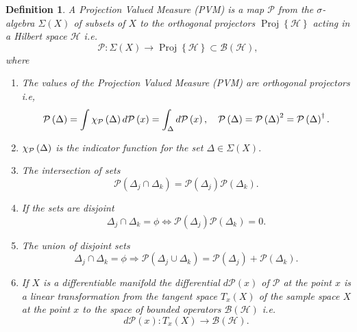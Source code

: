 \documentclass[aps,preprint]{revtex4}%
\newtheorem{definition}[theorem]{Definition}
\begin{document}
\begin{definition}
A Projection Valued Measure (PVM) is a map $\mathcal{P}$ from the $\sigma
$-algebra $\Sigma\left(  X\right)  $ of subsets of $X$ to the orthogonal
projectors $\operatorname*{Proj}\left\{  \mathcal{H}\right\}  $ acting in a
Hilbert space $\mathcal{H}$ i.e.
\begin{equation}
\mathcal{P}:\Sigma\left(  X\right)  \rightarrow\operatorname*{Proj}\left\{
\mathcal{H}\right\}  \subset\mathcal{B}\left(  \mathcal{H}\right)  ,
\end{equation}
where

\begin{enumerate}
\item The values of the Projection Valued Measure (PVM) are orthogonal
projectors i.e,
\begin{equation}
\mathcal{P}\left(  \Delta\right)  =\int{\large \chi}_{\mathcal{P}}\left(
\Delta\right)  d\mathcal{P}\left(  x\right)  =\int_{\Delta}d\mathcal{P}\left(
x\right)  ,\quad\mathcal{P}\left(  \Delta\right)  =\mathcal{P}\left(
\Delta\right)  ^{2}=\mathcal{P}\left(  \Delta\right)  ^{\dagger}.
\end{equation}


\item ${\large \chi}_{\mathcal{P}}\left(  \Delta\right)  $ is the indicator
function for the set $\Delta\in\Sigma\left(  X\right)  .$

\item The intersection of sets
\begin{equation}
\mathcal{P}\left(  \Delta_{j}\cap\Delta_{k}\right)  =\mathcal{P}\left(
\Delta_{j}\right)  \mathcal{P}\left(  \Delta_{k}\right)  .
\end{equation}


\item If the sets are disjoint
\begin{equation}
\Delta_{j}\cap\Delta_{k}=\phi\Leftrightarrow\mathcal{P}\left(  \Delta
_{j}\right)  \mathcal{P}\left(  \Delta_{k}\right)  =0.
\end{equation}


\item The union of disjoint sets
\begin{equation}
\Delta_{j}\cap\Delta_{k}=\phi\Rightarrow\mathcal{P}\left(  \Delta_{j}%
\cup\Delta_{k}\right)  =\mathcal{P}\left(  \Delta_{j}\right)  +\mathcal{P}%
\left(  \Delta_{k}\right)  .
\end{equation}


\item If $X$ is a \emph{differentiable manifold} the differential
$d\mathcal{P}\left(  x\right)  $ of $\mathcal{P}$ at the point $x$ is a linear
transformation from the tangent space $T_{x}\left(  X\right)  $ of the sample
space $X$ at the point $x$ to the space of bounded operators $\mathcal{B}%
\left(  \mathcal{H}\right)  $ i.e.
\begin{equation}
d\mathcal{P}\left(  x\right)  :T_{x}\left(  X\right)  \rightarrow
\mathcal{B}\left(  \mathcal{H}\right)  .
\end{equation}



\end{enumerate}
\end{definition}
\end{document}
